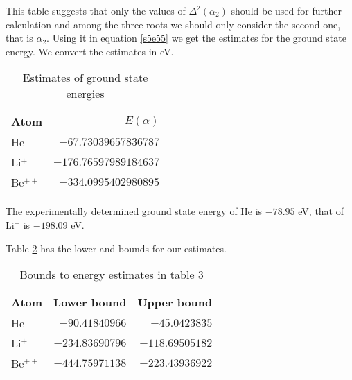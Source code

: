 \documentclass{article}
\numberwithin{equation}{section}
\begin{document}
This table suggests that only the values of $\Delta^2(\alpha_2)$
should be used for further calculation and among the three roots we
should only consider the second one, that is $\alpha_2$. Using it in
equation \eqref{s5e55} we get the estimates for the ground state energy.
We convert the estimates in eV.
\begin{table}[ht]
\centering
\begin{tabular}{lr}
Atom & $E(\alpha)$ \\
\hline
He & $-67.73039657836787$ \\
Li$^+$ & $-176.76597989184637$ \\
Be$^{++}$ & $-334.0995402980895$ 
\end{tabular}
\caption{Estimates of ground state energies}
\label{t3}
\end{table}

The experimentally determined ground state energy of He is $-78.95$ eV,
that of Li$^+$ is $-198.09$ eV.

Table \ref{t4} has the lower and bounds for our estimates.
\begin{table}[!ht]
\centering
\begin{tabular}{lrr}
Atom & Lower bound & Upper bound \\
\hline
He & $-90.41840966$ &  $-45.0423835$ \\
Li$^+$ & $-234.83690796$ &  $-118.69505182$ \\
Be$^{++}$ & $-444.75971138$ &  $-223.43936922$ 
\end{tabular}
\caption{Bounds to energy estimates in table 3}
\label{t4}
\end{table}
\end{document}

